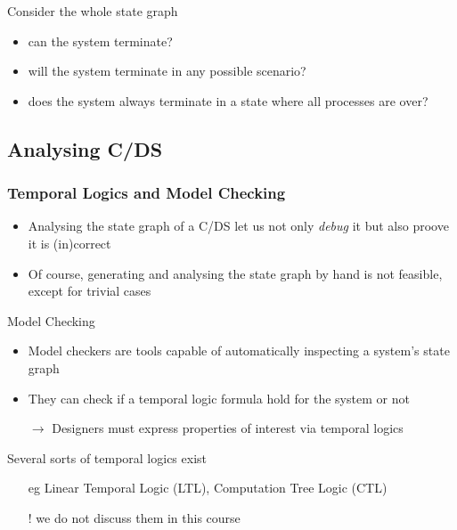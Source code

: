 \documentclass[presentation]{beamer}\mode<presentation>{\usetheme{AMSCesenaPurpleAndGold}}
\begin{document}
\begin{frame}
    \begin{alertblock}{Consider the whole state graph}
        \begin{itemize}
            \item can the system terminate?
            \item will the system terminate in any possible scenario?
            \item does the system always terminate in a state where all processes are over?
        \end{itemize}
    \end{alertblock}

\end{frame}

\subsection{Analysing C/DS}

\begin{frame}%
    \frametitle{Temporal Logics and Model Checking}

    \begin{itemize}
        \item Analysing the state graph of a C/DS let us not only \emph{debug} it but also \alert{proove} it is (in)correct
        
        \item Of course, generating and analysing the state graph by hand is not feasible, except for trivial cases
    \end{itemize}

    \vfill
    
    \begin{block}{Model Checking}
        \begin{itemize}
            \item Model checkers are tools capable of automatically inspecting a system's state graph
            \item They can check if a \alert{temporal logic} formula hold for the system or not
            \item[$\rightarrow$] Designers must express properties of interest via \alert{temporal logics}
        \end{itemize}
    \end{block}

    \vfill

    \begin{block}{Several sorts of temporal logics exist}
        \begin{itemize}
            \item[eg] Linear Temporal Logic (LTL), Computation Tree Logic (CTL)
            \item[!] we do not discuss them in this course 
        \end{itemize}
    \end{block}

\end{frame}
\end{document}
